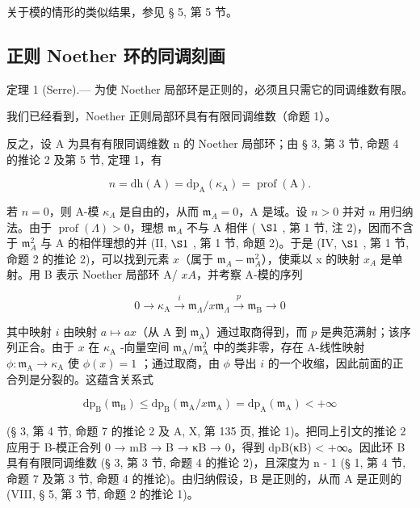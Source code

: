 关于模的情形的类似结果，参见 § 5, 第 5 节。

\subsection{正则 Noether 环的同调刻画}

定理 1 (Serre).--- 为使 Noether 局部环是正则的，必须且只需它的同调维数有限。

我们已经看到，Noether 正则局部环具有有限同调维数（命题 1）。

反之，设 A 为具有有限同调维数 n 的 Noether 局部环；由 § 3, 第 3 节, 命题 4 的推论 2 及第 5 节, 定理 1，有

\[
n = \mathrm{dh} (\mathrm{A}) = \mathrm{dp} _ {\mathrm{A}} (\kappa_ {\mathrm{A}}) = \operatorname{prof} (\mathrm{A}).
\]

若 \(n=0\)，则 A-模 \(\kappa_{A}\) 是自由的，从而 \(\mathfrak{m}_{A}=0\)，A 是域。设 \(n>0\) 并对 \(n\) 用归纳法。由于 \(\operatorname{prof}(\Lambda)>0\)，理想 \(\mathfrak{m}_{A}\) 不与 A 相伴 ( \(\S 1\) , 第 1 节, 注 2)，因而不含于 \(\mathfrak{m}_{A}^{2}\) 与 A 的相伴理想的并 (II, \(\S 1\) , 第 1 节, 命题 2)。于是 (IV, \(\S 1\) , 第 1 节, 命题 2 的推论 2)，可以找到元素 \(x\)（属于 \(\mathfrak{m}_{A}-\mathfrak{m}_{A}^{2}\)），使乘以 x 的映射 \(x_{A}\) 是单射。用 B 表示 Noether 局部环 A/ \(xA\)，并考察 A-模的序列

\[
0 \to \kappa_ {\mathrm{A}} \stackrel {i} {\longrightarrow} \mathfrak {m} _ {\Lambda} / x \mathfrak {m} _ {\Lambda} \stackrel {p} {\longrightarrow} \mathfrak {m} _ {\mathrm{B}} \to 0
\]

其中映射 \(i\) 由映射 \(a \mapsto ax\)（从 A 到 \(\mathfrak{m}_{\mathrm{A}}\)）通过取商得到，而 \(p\) 是典范满射；该序列正合。由于 \(x\) 在 \(\kappa_{\mathrm{A}}\) -向量空间 \(\mathfrak{m}_{\mathrm{A}} / \mathfrak{m}_{\mathrm{A}}^{2}\) 中的类非零，存在 A-线性映射 \(\phi : \mathfrak{m}_{\mathrm{A}} \to \kappa_{\mathrm{A}}\) 使 \(\phi(x) = 1\) ；通过取商，由 \(\phi\) 导出 \(i\) 的一个收缩，因此前面的正合列是分裂的。这蕴含关系式

\[
\mathrm{dp} _ {\mathrm{B}} \left(\mathfrak {m} _ {\mathrm{B}}\right) \leqslant \mathrm{dp} _ {\mathrm{B}} \left(\mathfrak {m} _ {\mathrm{A}} / x \mathfrak {m} _ {\mathrm{A}}\right) = \mathrm{dp} _ {\mathrm{A}} \left(\mathfrak {m} _ {\mathrm{A}}\right) <   + \infty
\]

(§ 3, 第 4 节, 命题 7 的推论 2 及 A, X, 第 135 页, 推论 1)。把同上引文的推论 2 应用于 B-模正合列 0 → mB → B → κB → 0，得到 dpB(κB) \textless{} +∞。因此环 B 具有有限同调维数 (§ 3, 第 3 节, 命题 4 的推论 2)，且深度为 n - 1 (§ 1, 第 4 节, 命题 7 及第 3 节, 命题 4 的推论)。由归纳假设，B 是正则的，从而 A 是正则的 (VIII, § 5, 第 3 节, 命题 2 的推论 1)。

